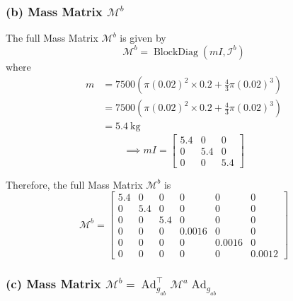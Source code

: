 \subsubsection*{(b) Mass Matrix \( \mathcal{M}^{b} \)}

The full Mass Matrix \( \mathcal{M}^{b} \) is given by
\begin{equation*}
    \mathcal{M}^{b}=\operatorname{BlockDiag}\left(m I, \mathcal{I}^{b}\right)
\end{equation*}
where
\begin{align*}
    m & =
    7500\left(\pi\left(0.02\right)^{2} \times 0.2+\frac{4}{3} \pi\left(0.02\right)^{3}\right)
    \\ & =
    7500\left(\pi\left(0.02\right)^{2} \times 0.2+\frac{4}{3} \pi\left(0.02\right)^{3}\right)
    \\ & =
    5.4\mathrm{~kg}
\end{align*}
\begin{equation*}
    \implies
    m I=\begin{bmatrix}
        5.4 & 0   & 0   \\
        0   & 5.4 & 0   \\
        0   & 0   & 5.4
    \end{bmatrix}
\end{equation*}

Therefore, the full Mass Matrix \( \mathcal{M}^{b} \) is
\begin{equation*}
    \boxed{
        \mathcal{M}^{b}
        =
        \begin{bmatrix}
            5.4 & 0   & 0   & 0      & 0      & 0      \\
            0   & 5.4 & 0   & 0      & 0      & 0      \\
            0   & 0   & 5.4 & 0      & 0      & 0      \\
            0   & 0   & 0   & 0.0016 & 0      & 0      \\
            0   & 0   & 0   & 0      & 0.0016 & 0      \\
            0   & 0   & 0   & 0      & 0      & 0.0012
        \end{bmatrix}
    }
\end{equation*}

\subsubsection*{(c) Mass Matrix \( \mathcal{M}^{b}=\operatorname{Ad}_{g_{a b}}^{\top} \mathcal{M}^{a} \operatorname{Ad}_{g_{a b}} \)}

